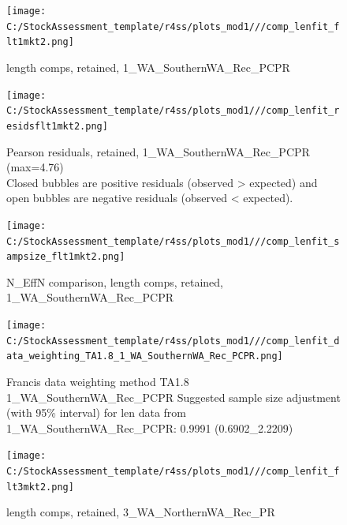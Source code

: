 \documentclass[12pt,]{article}
\begin{document}
\FloatBarrier

\FloatBarrier

\FloatBarrier

\FloatBarrier

\FloatBarrier

\FloatBarrier

\begin{figure}[htbp]
\centering
\texttt{[image: C:/StockAssessment\_template/r4ss/plots\_mod1///comp\_lenfit\_flt1mkt2.png]}
\caption{length comps, retained, 1\_WA\_SouthernWA\_Rec\_PCPR
\label{fig:mod1_1_comp_lenfit_flt1mkt2}}
\end{figure}

\begin{figure}[htbp]
\centering
\texttt{[image: C:/StockAssessment\_template/r4ss/plots\_mod1///comp\_lenfit\_residsflt1mkt2.png]}
\caption{Pearson residuals, retained, 1\_WA\_SouthernWA\_Rec\_PCPR
(max=4.76)\\
Closed bubbles are positive residuals (observed \textgreater{} expected)
and open bubbles are negative residuals (observed \textless{} expected).
\label{fig:mod1_2_comp_lenfit_residsflt1mkt2}}
\end{figure}

\begin{figure}[htbp]
\centering
\texttt{[image: C:/StockAssessment\_template/r4ss/plots\_mod1///comp\_lenfit\_sampsize\_flt1mkt2.png]}
\caption{N\_EffN comparison, length comps, retained,
1\_WA\_SouthernWA\_Rec\_PCPR
\label{fig:mod1_3_comp_lenfit_sampsize_flt1mkt2}}
\end{figure}

\begin{figure}[htbp]
\centering
\texttt{[image: C:/StockAssessment\_template/r4ss/plots\_mod1///comp\_lenfit\_data\_weighting\_TA1.8\_1\_WA\_SouthernWA\_Rec\_PCPR.png]}
\caption{Francis data weighting method TA1.8
1\_WA\_SouthernWA\_Rec\_PCPR Suggested sample size adjustment (with 95\%
interval) for len data from 1\_WA\_SouthernWA\_Rec\_PCPR: 0.9991
(0.6902\_2.2209)
\label{fig:mod1_4_comp_lenfit_data_weighting_TA1.8_1_WA_SouthernWA_Rec_PCPR}}
\end{figure}

\begin{figure}[htbp]
\centering
\texttt{[image: C:/StockAssessment\_template/r4ss/plots\_mod1///comp\_lenfit\_flt3mkt2.png]}
\caption{length comps, retained, 3\_WA\_NorthernWA\_Rec\_PR
\label{fig:mod1_5_comp_lenfit_flt3mkt2}}
\end{figure}
\end{document}

